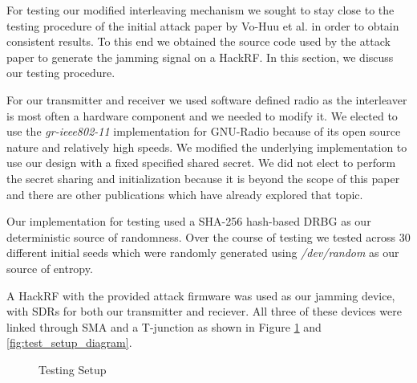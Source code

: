 \documentclass[sigconf]{acmart}
\begin{document}
For testing our modified interleaving mechanism we sought to stay close to the testing procedure of the initial attack paper by Vo-Huu et al. in order to obtain consistent results\cite{vo2016interleaving}. To this end we obtained the source code used by the attack paper to generate the jamming signal on a HackRF\cite{vo2016software}. In this section, we discuss our testing procedure.

For our transmitter and receiver we used software defined radio as the interleaver is most often a hardware component and we needed to modify it. We elected to use the \textit{gr-ieee802-11} implementation for GNU-Radio because of its open source nature and relatively high speeds\cite{gr_ieee802}. We modified the underlying implementation to use our design with a fixed specified shared secret. We did not elect to perform the secret sharing and initialization because it is beyond the scope of this paper and there are other publications which have already explored that topic. 

Our implementation for testing used a SHA-256 hash-based DRBG as our deterministic source of randomness. Over the course of testing we tested across 30 different initial seeds which were randomly generated using \textit{/dev/random} as our source of entropy. 

A HackRF with the provided attack firmware was used as our jamming device, with SDRs for both our transmitter and reciever. All three of these devices were linked through SMA and a T-junction as shown in Figure \ref{fig:test_setup} and \ref{fig:test_setup_diagram}.

\begin{figure}[ht]
    \centering
    \caption{Testing Setup}
    \label{fig:test_setup}
\end{figure}
\end{document}
